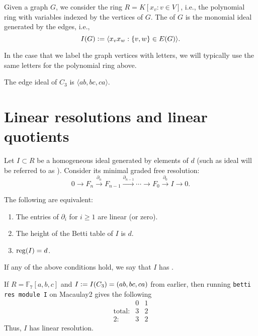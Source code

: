 \documentclass[12pt]{article}
\begin{document}
\begin{defn}
	Given a graph $G$, we consider the ring $R = K[x_{v} : v \in V]$, i.e., the polynomial ring with variables indexed by the vertices of $G$. \newline
	The  of $G$ is the monomial ideal generated by the edges, i.e., 
	\begin{equation*} 
		I(G) \vcentcolon= \langle x_{v} x_{w} : \{v, w\} \in E(G) \rangle.
	\end{equation*}
\end{defn}
In the case that we label the graph vertices with letters, we will typically use the same letters for the polynomial ring above. 

\begin{ex}
	The edge ideal of $C_{3}$ is $\langle ab, bc, ca \rangle$.
\end{ex}

\section{Linear resolutions and linear quotients}

Let $I \subset R$ be a homogeneous ideal generated by elements of $d$ (such as ideal will be referred to as ). Consider its minimal graded free resolution:
\begin{equation*} 
	0 \to F_{n} \xrightarrow{\partial_{n}} F_{n - 1} \xrightarrow{\partial_{n - 1}} \cdots \to F_{0} \xrightarrow{\partial_{0}} I \to 0.
\end{equation*}

The following are equivalent:
\begin{enumerate}[label=(\alph*)]
	\item The entries of $\partial_{i}$ for $i \ge 1$ are linear (or zero).
	\item The height of the Betti table of $I$ is $d$. 
	\item $\operatorname{reg}(I) = d$.
\end{enumerate}

If any of the above conditions hold, we say that $I$ has . 

\begin{ex}
	If $R = \mathbb{F}_{7}[a, b, c]$ and $I \vcentcolon= I(C_{3}) = (ab, bc, ca)$ from earlier, then running \texttt{betti res module I} on Macaulay2 gives the following
	\begin{equation*} 
		\begin{matrix}
        & 0 & 1\\
	     \text{total:}
	        & 3 & 2\\
	     2: & 3 & 2
	     \end{matrix}
	\end{equation*}	
	Thus, $I$ has linear resolution.
\end{ex}
\end{document}
